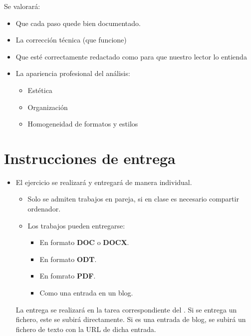 Se valorará:
\begin{itemize}
\item Que cada paso quede bien documentado. 
\item La corrección técnica (que funcione)
\item Que esté correctamente redactado como para que nuestro lector lo entienda
\item La apariencia profesional del análisis:
  \begin{itemize}
  \item Estética
  \item Organización
  \item Homogeneidad de formatos y estilos
  \end{itemize}
\end{itemize}

\section{Instrucciones de entrega}
\begin{itemize}
\item El ejercicio se realizará y entregará de manera individual.
  \begin{itemize}
  \item Solo se admiten trabajos en pareja, si en clase es necesario compartir ordenador.


  \item Los trabajos pueden entregarse:
    \begin{itemize}
    \item En formato \textbf{DOC} o \textbf{DOCX}.
    \item En formato \textbf{ODT}.
    \item En fomrato \textbf{PDF}. 
    \item Como una entrada en un blog.  
    \end{itemize}
  \end{itemize}

  La entrega se realizará en la tarea correspondiente del . Si se entrega un fichero, este se subirá directamente. Si es una entrada de blog, se subirá un fichero de texto con la URL de dicha entrada.

  
\end{itemize}


